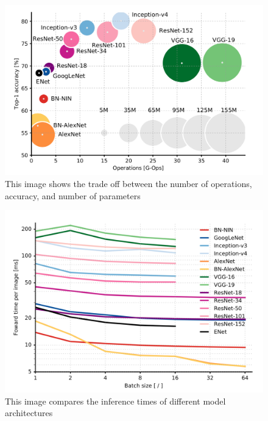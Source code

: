 \documentclass[10pt,journal,compsoc]{IEEEtran}
\begin{document}
		\begin{figure}[h]
			\centering
			\includegraphics[scale=1]{tradeoff}
			\caption{This image shows the trade off between the number of operations, accuracy, and number of parameters}
		\end{figure}
		
		\begin{figure}[h]
			\centering
			\includegraphics[scale=1]{tradeoff_2}
			\caption{This image compares the inference times of different model architectures}
		\end{figure}
		
\end{document}
